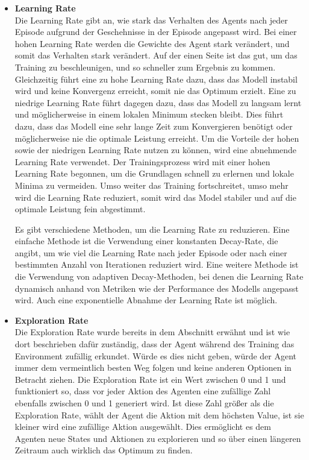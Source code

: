 \begin{itemize}
    \item \textbf{Learning Rate}\\
    Die Learning Rate gibt an, wie stark das Verhalten des Agents nach jeder Episode aufgrund der Geschehnisse in der Episode angepasst wird. Bei einer hohen Learning Rate werden die Gewichte des Agent stark verändert, und somit das Verhalten stark verändert. Auf der einen Seite ist das gut, um das Training zu beschleunigen, und so schneller zum Ergebnis zu kommen. Gleichzeitig führt eine zu hohe Learning Rate dazu, dass das Modell instabil wird und keine Konvergenz erreicht, somit nie das Optimum erzielt. Eine zu niedrige Learning Rate führt dagegen dazu, dass das Modell zu langsam lernt und möglicherweise in einem lokalen Minimum stecken bleibt. Dies führt dazu, dass das Modell eine sehr lange Zeit zum Konvergieren benötigt oder möglicherweise nie die optimale Leistung erreicht. Um die Vorteile der hohen sowie der niedrigen Learning Rate nutzen zu können, wird eine abnehmende Learning Rate verwendet. Der Trainingsprozess wird mit einer hohen Learning Rate begonnen, um die Grundlagen schnell zu erlernen und lokale Minima zu vermeiden. Umso weiter das Training fortschreitet, umso mehr wird die Learning Rate reduziert, somit wird das Model stabiler und auf die optimale Leistung fein abgestimmt.

    Es gibt verschiedene Methoden, um die Learning Rate zu reduzieren. Eine einfache Methode ist die Verwendung einer konstanten Decay-Rate, die angibt, um wie viel die Learning Rate nach jeder Episode oder nach einer bestimmten Anzahl von Iterationen reduziert wird. Eine weitere Methode ist die Verwendung von adaptiven Decay-Methoden, bei denen die Learning Rate dynamisch anhand von Metriken wie der Performance des Modells angepasst wird. Auch eine exponentielle Abnahme der Learning Rate ist möglich.
    \item \textbf{Exploration Rate }\\
    Die Exploration Rate wurde bereits in dem Abschnitt  erwähnt und ist wie dort beschrieben dafür zuständig, dass der Agent während des Training das Environment zufällig erkundet. Würde es dies nicht geben, würde der Agent immer dem vermeintlich besten Weg folgen und keine anderen Optionen in Betracht ziehen. Die Exploration Rate ist ein Wert zwischen 0 und 1 und funktioniert so, dass vor jeder Aktion des Agenten eine zufällige Zahl ebenfalls zwischen 0 und 1 generiert wird. Ist diese Zahl größer als die Exploration Rate, wählt der Agent die Aktion mit dem höchsten Value, ist sie kleiner wird eine zufällige Aktion ausgewählt. Dies ermöglicht es dem Agenten neue States und Aktionen zu explorieren und so über einen längeren Zeitraum auch wirklich das Optimum zu finden.


\end{itemize}
